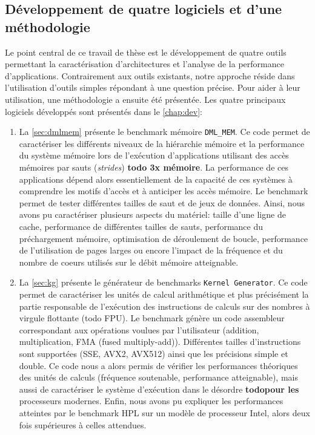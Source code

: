         
    \subsection{Développement de quatre logiciels et d'une méthodologie}
        
        Le point central de ce travail de thèse est le développement de quatre outils permettant la caractérisation d'architectures et l'analyse de la performance d'applications. Contrairement aux outils existants, notre approche réside dans l'utilisation d'outils simples répondant à une question précise. Pour aider à leur utilisation, une méthodologie a ensuite été présentée. Les quatre principaux logiciels développés sont présentés dans le \autoref{chap:dev}:
        \begin{enumerate}
            \item La \autoref{sec:dmlmem} présente le benchmark mémoire \verb|DML_MEM|. Ce code permet de caractériser les différents niveaux de la hiérarchie mémoire et la performance du système mémoire lors de l'exécution d'applications utilisant des accès mémoires par sauts (\textit{strides}) \textbf{todo 3x mémoire}. La performance de ces applications dépend alors essentiellement de la capacité de ces systèmes à comprendre les motifs d'accès et à anticiper les accès mémoire.
            Le benchmark permet de tester différentes tailles de saut et de jeux de données. Ainsi, nous avons pu caractériser plusieurs aspects du matériel: taille d'une ligne de cache, performance de différentes tailles de sauts, performance du préchargement mémoire, optimisation de déroulement de boucle, performance de l'utilisation de pages larges ou encore l'impact de la fréquence et du nombre de coeurs utilisés sur le débit mémoire atteignable.
            
            \item La \autoref{sec:kg} présente le générateur de benchmarks \verb|Kernel Generator|. Ce code permet de caractériser les unités de calcul arithmétique et plus précisément la partie responsable de l'exécution des instructions de calculs sur des nombres à virgule flottante (todo \gls{FPU}). Le benchmark génère un code assembleur correspondant aux opérations voulues par l'utilisateur (addition, multiplication, FMA (fused multiply-add)).  Différentes tailles d'instructions sont supportées (SSE, AVX2, AVX512) ainsi que les précisions simple et double. Ce code nous a alors permis de vérifier les performances théoriques des unités de calculs (fréquence soutenable, performance atteignable), mais aussi de caractériser le système d'exécution dans le désordre \textbf{todopour les} processeurs modernes. Enfin, nous avons pu expliquer les performances atteintes par le benchmark HPL sur un modèle de processeur Intel, alors deux fois supérieures à celles attendues. 
            

\end{enumerate}
